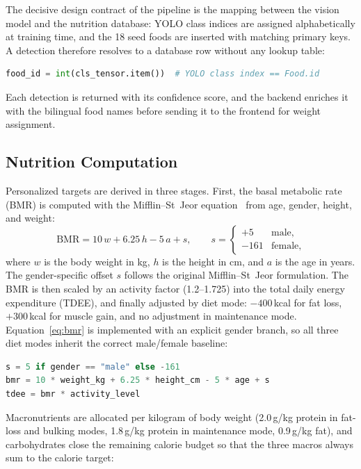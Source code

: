 \documentclass[11pt,a4paper]{article}
\begin{document}
The decisive design contract of the pipeline is the mapping between the vision model and the nutrition database: YOLO class indices are assigned alphabetically at training time, and the 18 seed foods are inserted with matching primary keys. A detection therefore resolves to a database row without any lookup table:

\begin{lstlisting}[language=Python]
food_id = int(cls_tensor.item())  # YOLO class index == Food.id
\end{lstlisting}

Each detection is returned with its confidence score, and the backend enriches it with the bilingual food names before sending it to the frontend for weight assignment.

\subsection{Nutrition Computation}

Personalized targets are derived in three stages. First, the basal metabolic rate (BMR) is computed with the Mifflin--St~Jeor equation~\cite{mifflin} from age, gender, height, and weight:
\begin{equation}
  \mathrm{BMR} = 10\,w + 6.25\,h - 5\,a + s, \qquad
  s =
  \begin{cases}
    +5   & \text{male},\\
    -161 & \text{female},
  \end{cases}
  \label{eq:bmr}
\end{equation}
where $w$ is the body weight in kg, $h$ is the height in cm, and $a$ is the age in years. The gender-specific offset $s$ follows the original Mifflin--St~Jeor formulation. The BMR is then scaled by an activity factor (1.2--1.725) into the total daily energy expenditure (TDEE), and finally adjusted by diet mode: $-400$\,kcal for fat loss, $+300$\,kcal for muscle gain, and no adjustment in maintenance mode. Equation~\eqref{eq:bmr} is implemented with an explicit gender branch, so all three diet modes inherit the correct male/female baseline:

\begin{lstlisting}[language=Python]
s = 5 if gender == "male" else -161
bmr = 10 * weight_kg + 6.25 * height_cm - 5 * age + s
tdee = bmr * activity_level
\end{lstlisting}

Macronutrients are allocated per kilogram of body weight (2.0\,g/kg protein in fat-loss and bulking modes, 1.8\,g/kg protein in maintenance mode, 0.9\,g/kg fat), and carbohydrates close the remaining calorie budget so that the three macros always sum to the calorie target:
\end{document}
